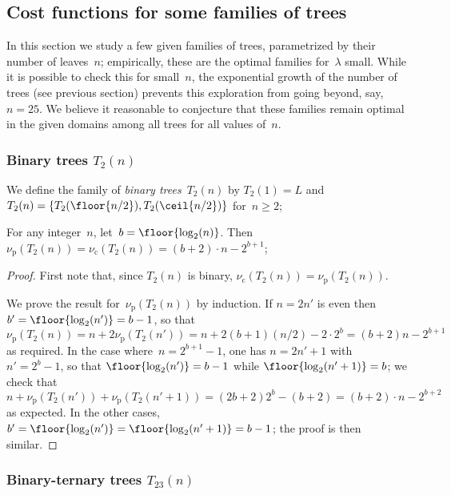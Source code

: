 \documentclass{article}
\def\pcost{ν_\mathrm{p}}
\def\scost{ν_\mathrm{c}}
\def\treefrom#1{\left\{#1\right\}}
\begin{document}
\subsection{Cost functions for some families of trees}

In this section we study a few given families of trees,
parametrized by their number of leaves~$n$;
empirically, these are the optimal families for~$λ$ small.
While it is possible to check this for small~$n$,
the exponential growth of the number of trees
(see previous section)
prevents this exploration from going beyond, say, $n = 25$.
We believe it reasonable to conjecture that
these families remain optimal in the given domains
among all trees for all values of~$n$.

\subsubsection{Binary trees $T_2(n)$}

We define the family of \emph{binary trees}~$T_2(n)$ by
$T_2(1) = L$ and $T_2(n) = \treefrom{T_2(\floor{n/2}),
T_2(\ceil{n/2})}$ for~$n ≥ 2$;

\begin{prop}\label{prop:cost-T2}
For any integer~$n$, let~$b = \floor{\log_2(n)}$. Then
$\pcost(T_{2}(n)) = \scost(T_2(n)) = (b+2)⋅n - 2^{b+1}$;
\end{prop}


\begin{proof}
First note that, since $T_2(n)$ is binary,
$\scost(T_2(n)) = \pcost(T_2(n))$.

We prove the result for~$\pcost(T_2(n))$ by induction.
If $n = 2 n'$ is even then $b' = \floor{\log_2(n')} = b-1$,
so that $\pcost(T_2(n)) = n + 2 \pcost(T_2(n'))
 = n + 2 (b+1)(n/2) - 2⋅ 2^b = (b+2) n - 2^{b+1}$ as required.
In the case where~$n = 2^{b+1}-1$,
one has $n = 2n'+1$ with $n' = 2^{b}-1$,
so that $\floor{\log_2(n')} = b-1$
while $\floor{\log_2(n'+1)} = b$;
we check that $n + \pcost(T_2(n')) + \pcost(T_2(n'+1))
 = (2b+2) 2^b - (b+2)
 = (b+2)⋅n-2^{b+2}$ as expected.
In the other cases, $b' = \floor{\log_2(n')} = \floor{\log_2(n'+1)} = b-1$;
the proof is then similar.
\end{proof}

\subsubsection{Binary-ternary trees $T_{23}(n)$}
\end{document}
